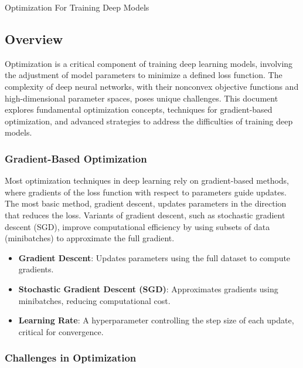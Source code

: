 \begin{notes}{Optimization For Training Deep Models}
    \subsection*{Overview}

    Optimization is a critical component of training deep learning models, involving the adjustment of model parameters to minimize a defined loss function. The complexity of deep neural networks, with 
    their nonconvex objective functions and high-dimensional parameter spaces, poses unique challenges. This document explores fundamental optimization concepts, techniques for gradient-based optimization, 
    and advanced strategies to address the difficulties of training deep models.
    
    \subsubsection*{Gradient-Based Optimization}
    
    Most optimization techniques in deep learning rely on gradient-based methods, where gradients of the loss function with respect to parameters guide updates. The most basic method, gradient descent, 
    updates parameters in the direction that reduces the loss. Variants of gradient descent, such as stochastic gradient descent (SGD), improve computational efficiency by using subsets of data (minibatches) 
    to approximate the full gradient.
    
    \begin{highlight}
        \begin{itemize}
            \item \textbf{Gradient Descent}: Updates parameters using the full dataset to compute gradients.
            \item \textbf{Stochastic Gradient Descent (SGD)}: Approximates gradients using minibatches, reducing computational cost.
            \item \textbf{Learning Rate}: A hyperparameter controlling the step size of each update, critical for convergence.
        \end{itemize}
    \end{highlight}
    
    \subsubsection*{Challenges in Optimization}
    

\end{notes}
